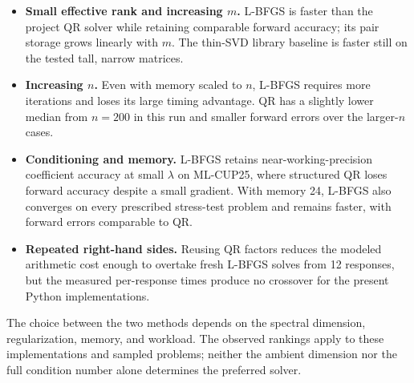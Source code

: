 \begin{itemize}
    \item \textbf{Small effective rank and increasing $m$.} L-BFGS is faster
    than the project QR solver while retaining comparable forward accuracy;
    its pair storage grows linearly with $m$. The thin-SVD library baseline
    is faster still on the tested tall, narrow matrices.
    \item \textbf{Increasing $n$.} Even with memory scaled to $n$, L-BFGS
    requires more iterations and loses its large timing advantage. QR has
    a slightly lower median from $n=200$ in this run and smaller forward
    errors over the larger-$n$ cases.
    \item \textbf{Conditioning and memory.} L-BFGS retains near-working-precision
    coefficient accuracy at small $\lambda$ on ML-CUP25, where structured QR
    loses forward accuracy despite a small gradient. With memory 24,
    L-BFGS also converges on every prescribed stress-test problem and remains
    faster, with forward errors comparable to QR.
    \item \textbf{Repeated right-hand sides.} Reusing QR factors reduces the
    modeled arithmetic cost enough to overtake fresh L-BFGS solves from
    12 responses, but the measured per-response times produce no crossover
    for the present Python implementations.
\end{itemize}
\noindent The choice between the two methods depends on the spectral
dimension, regularization, memory, and workload. The observed rankings
apply to these implementations and sampled problems; neither the ambient
dimension nor the full condition number alone determines the preferred
solver.
